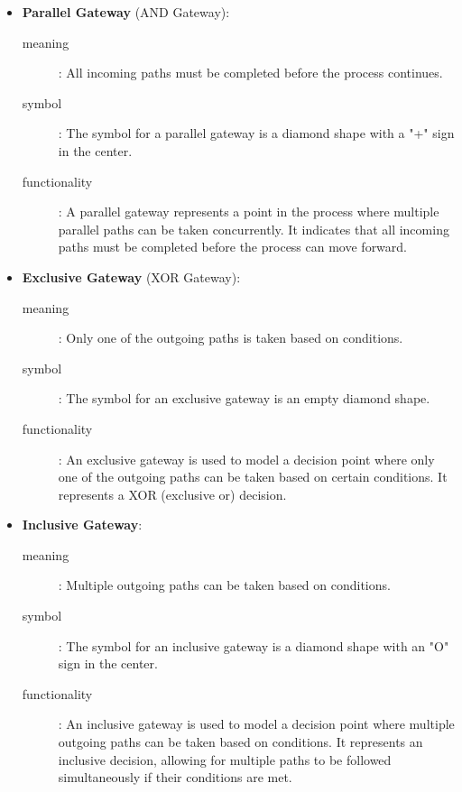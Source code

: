\begin{itemize}
   \item \textbf{Parallel Gateway} (AND Gateway):
         \begin{description}
            \item[meaning]: All incoming paths must be completed before the process continues.
            \item[symbol]: The symbol for a parallel gateway is a diamond shape with a "+" sign in the center.
            \item[functionality]: A parallel gateway represents a point in the process where multiple parallel paths can be taken concurrently. It indicates that all incoming paths must be completed before the process can move forward.
         \end{description}
\end{itemize}
\begin{itemize}
   \item \textbf{Exclusive Gateway} (XOR Gateway):
         \begin{description}
            \item[meaning]: Only one of the outgoing paths is taken based on conditions.
            \item[symbol]: The symbol for an exclusive gateway is an empty diamond shape.
            \item[functionality]: An exclusive gateway is used to model a decision point where only one of the outgoing paths can be taken based on certain conditions. It represents a XOR (exclusive or) decision.
         \end{description}
\end{itemize}
\begin{itemize}
   \item \textbf{Inclusive Gateway}:
         \begin{description}
            \item[meaning]: Multiple outgoing paths can be taken based on conditions.
            \item[symbol]: The symbol for an inclusive gateway is a diamond shape with an "O" sign in the center.
            \item[functionality]: An inclusive gateway is used to model a decision point where multiple outgoing paths can be taken based on conditions. It represents an inclusive decision, allowing for multiple paths to be followed simultaneously if their conditions are met.
         \end{description}
\end{itemize}

